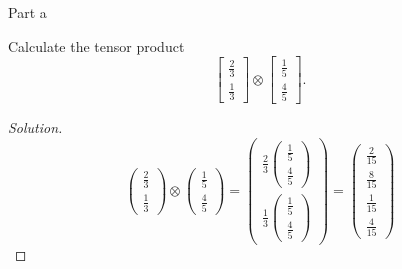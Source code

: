 \begin{solution}{Part a}\label{ques:2a}
  \begin{question}
    Calculate the tensor product 
    \[
    \begin{bmatrix}
    \frac{2}{3}\\[0.1em]
    \frac{1}{3}
    \end{bmatrix}\otimes
    \begin{bmatrix}
    \frac{1}{5}\\[0.1em]
    \frac{4}{5}
    \end{bmatrix}.
    \]
  \end{question}
  \tcblower{}
  \begin{proof}[Solution]
    \begin{equation}
      \begin{pmatrix}
        \frac{2}{3}\\[0.1em]
        \frac{1}{3}
      \end{pmatrix}
      \otimes
      \begin{pmatrix}
        \frac{1}{5}\\[0.1em]
        \frac{4}{5}
      \end{pmatrix}
      =
      \begin{pmatrix}
        \frac{2}{3}\begin{pmatrix}
          \frac{1}{5}\\[0.1em]
          \frac{4}{5}
        \end{pmatrix}\\[1em]
        \frac{1}{3}\begin{pmatrix}
          \frac{1}{5}\\[0.1em]
          \frac{4}{5}
        \end{pmatrix}
      \end{pmatrix}
      =
      \begin{pmatrix}
        \frac{2}{15}\\[0.1em]
        \frac{8}{15}\\[0.1em]
        \frac{1}{15}\\[0.1em]
        \frac{4}{15}
      \end{pmatrix}
    \end{equation}
  \end{proof}
\end{solution}

